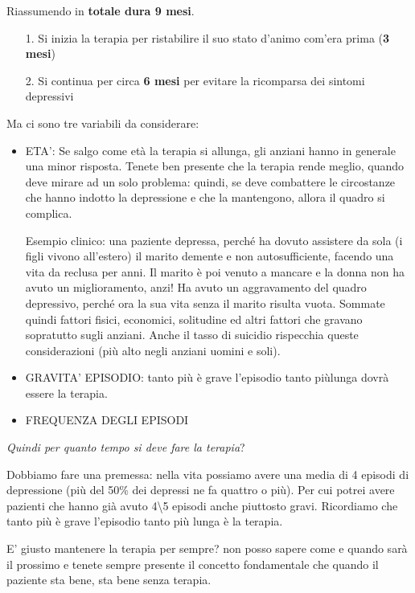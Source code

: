 Riassumendo in \textbf{totale dura 9 mesi}.

\begin{itemize}
\item[1.]
  Si inizia la terapia per ristabilire il suo stato d'animo com'era
  prima (\textbf{3 mesi})
\item[2.]
  Si continua per circa \textbf{6 mesi} per evitare la ricomparsa dei
  sintomi depressivi
\end{itemize}

Ma ci sono tre variabili da considerare:

\begin{itemize}
\item
  ETA': Se salgo come età la terapia si allunga, gli anziani hanno in
  generale una minor risposta. Tenete ben presente che la terapia rende
  meglio, quando deve mirare ad un solo problema: quindi, se deve
  combattere le circostanze che hanno indotto la depressione e che la
  mantengono, allora il quadro si complica.

Esempio clinico: una paziente depressa, perché ha dovuto assistere da
sola (i figli vivono all'estero) il marito demente e non
autosufficiente, facendo una vita da reclusa per anni. Il marito è poi
venuto a mancare e la donna non ha avuto un miglioramento, anzi! Ha
avuto un aggravamento del quadro depressivo, perché ora la sua vita
senza il marito risulta vuota. Sommate quindi fattori fisici, economici,
solitudine ed altri fattori che gravano sopratutto sugli anziani. Anche
il tasso di suicidio rispecchia queste considerazioni (più alto negli
anziani uomini e soli).

\item
  GRAVITA' EPISODIO: tanto più è grave l'episodio tanto piùlunga dovrà
  essere la terapia.
\item
  FREQUENZA DEGLI EPISODI
\end{itemize}

\emph{Quindi per quanto tempo si deve fare la terapia}?

Dobbiamo fare una premessa: nella vita possiamo avere una media di 4
episodi di depressione (più del 50\% dei depressi ne fa quattro o più).
Per cui potrei avere pazienti che hanno già avuto 4\textbackslash{}5
episodi anche piuttosto gravi. Ricordiamo che tanto più è grave
l'episodio tanto più lunga è la terapia.

E' giusto mantenere la terapia per sempre? non posso sapere come e
quando sarà il prossimo e tenete sempre presente il concetto
fondamentale che quando il paziente sta bene, sta bene senza terapia.

